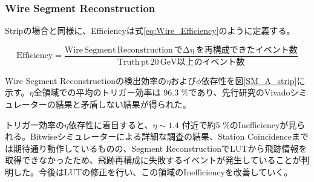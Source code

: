 \subsubsection{Wire Segment Reconstruction}
\par
Stripの場合と同様に、Efficiencyは式\ref{eq:Wire_Efficiency}のように定義する。

\begin{equation}
    \mathrm {Efficiency} = \frac{\mathrm{Wire\,Segment \,Reconstruction\,で\Delta\eta\,を再構成できたイベント数}}{\mathrm{Truth\,pt \,20 \,GeV以上のイベント数}}
    \label{eq:Wire_Efficiency}
\end{equation}


Wire Segment Reconstructionの検出効率の$\eta$および$\phi$依存性を図\ref{SM_A_strip}に示す。$\eta$全領域での平均のトリガー効率は 96.3 \%であり、先行研究のVivadoシミュレーターの結果と矛盾しない結果が得られた。

トリガー効率の$\eta$依存性に着目すると、$\eta \sim 1.4$ 付近で約5 \%のInefficiencyが見られる。Bitwiseシミュレーターによる詳細な調査の結果、Station Coincidenceまでは期待通り動作しているものの、Segment ReconstructionでLUTから飛跡情報を取得できなかったため、飛跡再構成に失敗するイベントが発生していることが判明した。今後はLUTの修正を行い、この領域のInefficiencyを改善していく。

